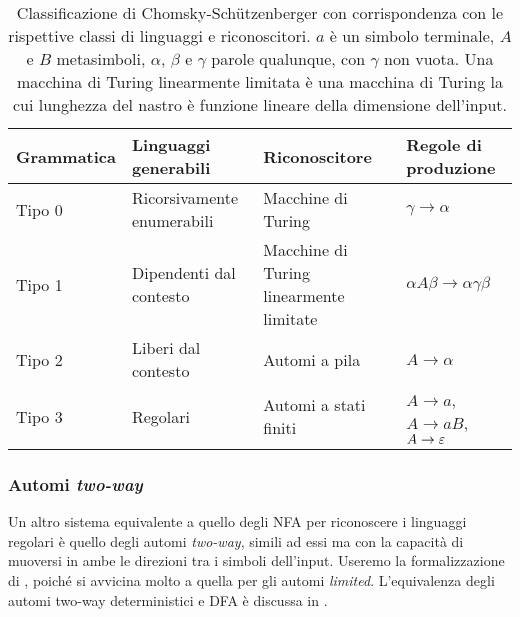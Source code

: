 \begin{table}
	\caption{Classificazione di Chomsky-Schützenberger con corrispondenza con le rispettive classi di linguaggi e riconoscitori. $a$ è un simbolo terminale, $A$ e $B$ metasimboli, $\alpha$, $\beta$ e $\gamma$ parole qualunque, con $\gamma$ non vuota. Una macchina di Turing linearmente limitata è una macchina di Turing la cui lunghezza del nastro è funzione lineare della dimensione dell'input.}
	\label{tab:prel:chomskyhier}
	\centering
	\begin{tabularx}{\textwidth}{lXXl}
		\toprule
		\textbf{Grammatica} & \textbf{Linguaggi generabili} & \textbf{Riconoscitore}                  & \textbf{Regole di produzione}         \\
		\midrule
		Tipo 0              & Ricorsivamente enumerabili    & Macchine di Turing                      & $\gamma\to\alpha$                     \\
		Tipo 1              & Dipendenti dal contesto       & Macchine di Turing linearmente limitate & $\alpha A\beta\to\alpha\gamma\beta$   \\
		Tipo 2              & Liberi dal contesto           & Automi a pila                           & $A\to\alpha$                          \\
		Tipo 3              & Regolari                      & Automi a stati finiti                   & $A\to a$, $A\to aB$, $A\to\varepsilon$ \\
		\bottomrule
	\end{tabularx}
\end{table}

\subsubsection{Automi \emph{two-way}}
Un altro sistema equivalente a quello degli NFA per riconoscere i linguaggi regolari è quello degli automi \emph{two-way}, simili ad essi ma con la capacità di muoversi in ambe le direzioni tra i simboli dell'input. Useremo la formalizzazione di \cite{Pighizzini:14:limitedRE}, poiché si avvicina molto a quella per gli automi \emph{limited}. L'equivalenza degli automi two-way deterministici e DFA è discussa in \cite{Shallit:09:secondLFA}.

